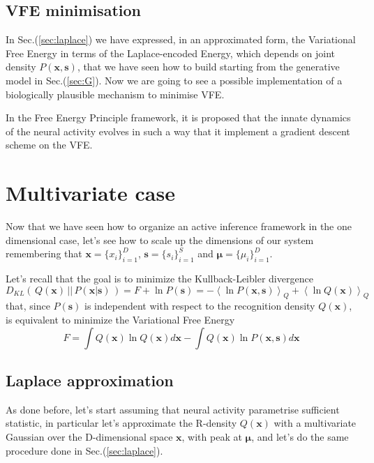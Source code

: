 \documentclass[a4paper, 10pt]{article}
\begin{document}
\subsection{VFE minimisation}
In Sec.(\ref{sec:laplace}) we have expressed, in an approximated form, the Variational Free Energy in terms of the Laplace-encoded Energy, which depends on joint density $P(\mathbf x, \mathbf s)$, that we have seen how to build starting from the generative model in Sec.(\ref{sec:G}). Now we are going to see a possible implementation of a biologically plausible mechanism to minimise VFE.

In the Free Energy Principle framework, it is proposed that the innate dynamics of the neural activity evolves in such a way that it implement a gradient descent scheme on the VFE. 










\newpage
\section{Multivariate case}
Now that we have seen how to organize an active inference framework in the one dimensional case, let's see how to scale up the dimensions of our system remembering that $\mathbf x = \lbrace x_i \rbrace_{i=1}^D$, $\mathbf s = \lbrace s_i \rbrace_{i=1}^S$ and $\bm \mu = \lbrace \mu_i \rbrace_{i=1}^D$.

Let's recall that the goal is to minimize the Kullback-Leibler  divergence
\begin{equation}
D_{KL} (\, Q(\mathbf x)\, ||\, P(\mathbf x|\mathbf s)\, )  =  F + \ln P(\mathbf s) = - \left< \ln P(\mathbf x,\mathbf s) \right>_{Q} + \left< \ln Q(\mathbf x) \right>_{Q} 
\end{equation}
that, since $P(\mathbf s)$ is independent with respect to the recognition density $Q(\mathbf x)$, is equivalent to minimize the Variational Free Energy
\begin{equation}
F = \int Q(\mathbf x) \ln Q(\mathbf x) d\mathbf x - \int Q(\mathbf x) \ln P(\mathbf x,\mathbf s) d\mathbf x
\end{equation}


\subsection{Laplace approximation}
As done before, let's start assuming that neural activity parametrise sufficient statistic, in particular let's approximate the R-density $Q(\mathbf x)$ with a multivariate Gaussian over the D-dimensional space $\mathbf x$, with peak at $\boldsymbol \mu$, and let's do the same procedure done in Sec.(\ref{sec:laplace}).
\end{document}
